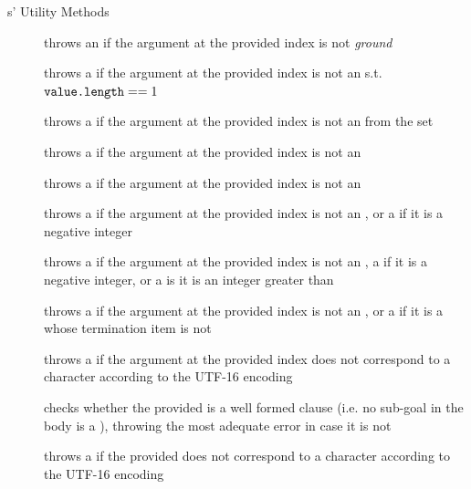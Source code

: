 \documentclass[handout]{beamer}
\begin{document}
\begin{frame}[allowframebreaks]{s' Utility Methods}
\begin{description}
        \item[] throws an  if the argument at the provided index is not \emph{ground}
        \item[] throws a  if the argument at the provided index is not an  s.t. $\texttt{value.length} == 1$
        \item[] throws a  if the argument at the provided index is not an  from the set 
        \item[] throws a  if the argument at the provided index is not an 
        \item[] throws a  if the argument at the provided index is not an 
        \item[] throws a  if the argument at the provided index is not an , or a  if it is a negative integer
        \item[] throws a  if the argument at the provided index is not an , a  if it is a negative integer, or a  is it is an integer greater than 
        \item[] throws a  if the argument at the provided index is not an , or a  if it is a  whose termination item is not \pl{[]}
        \item[] throws a  if the argument at the provided index does not correspond to a character according to the UTF-16 encoding
        \item[] checks whether the provided  is a well formed clause (i.e. no sub-goal in the body is a ), throwing the most adequate error in case it is not
        \item[] throws a  if the provided  does not correspond to a character according to the UTF-16 encoding

\end{description}
\end{frame}
\end{document}
